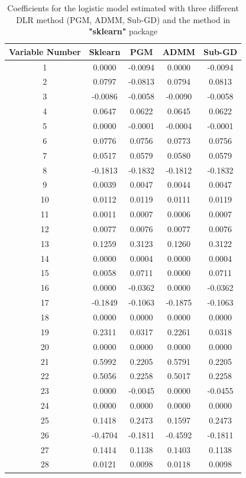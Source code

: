 \documentclass[11pt,en,authoryear]{elegantpaper}
\numberwithin{equation}{section}
\begin{document}
\begin{table}[h]
\label{table_res}
\centering
\begin{tabular}{c||c|c|c|c}
\hline
\hline
\textbf{Variable Number} & \textbf{Sklearn} &  \textbf{PGM}    &   \textbf{ADMM} &  \textbf{Sub-GD} \\ 
 \hline
1 & 0.0000  & -0.0094 &  0.0000 & -0.0094 \\ 
2 & 0.0797  & -0.0813 &  0.0794 &  0.0813 \\
3 & -0.0086 & -0.0058 & -0.0090 & -0.0058 \\
4 & 0.0647  &  0.0622 &  0.0645 &  0.0622 \\
5 & 0.0000  & -0.0001 & -0.0004 & -0.0001 \\
6 & 0.0776  &  0.0756 &  0.0773 &  0.0756 \\
7 & 0.0517  &  0.0579 &  0.0580 &  0.0579 \\
8 & -0.1813 & -0.1832 & -0.1812 & -0.1832 \\
9 & 0.0039  &  0.0047 &  0.0044 &  0.0047 \\
10 & 0.0112  &  0.0119 &  0.0111 &  0.0119 \\
11 & 0.0011  &  0.0007 &  0.0006 &  0.0007 \\
12 & 0.0077  &  0.0076 &  0.0077 &  0.0076 \\
13 & 0.1259  &  0.3123 &  0.1260 &  0.3122 \\
14 & 0.0000  &  0.0004 &  0.0000 &  0.0004 \\
15 & 0.0058  &  0.0711 &  0.0000 &  0.0711 \\
16 & 0.0000  & -0.0362 &  0.0000 & -0.0362 \\
17 & -0.1849 & -0.1063 & -0.1875 & -0.1063 \\
18 & 0.0000  &  0.0000 &  0.0000 &  0.0000 \\
19 & 0.2311  &  0.0317 &  0.2261 &  0.0318 \\
20 & 0.0000  &  0.0000 &  0.0000 &  0.0000 \\
21 & 0.5992  &  0.2205 &  0.5791 &  0.2205 \\
22 & 0.5056  &  0.2258 &  0.5017 &  0.2258 \\
23 & 0.0000  & -0.0045 &  0.0000 & -0.0455 \\
24 & 0.0000  &  0.0000 &  0.0000 &  0.0000 \\
25 & 0.1418  &  0.2473 &  0.1597 &  0.2473 \\
26 & -0.4704 & -0.1811 & -0.4592 & -0.1811 \\
27 & 0.1414  &  0.1138 &  0.1403 &  0.1138 \\
28 & 0.0121  &  0.0098 &  0.0118 &  0.0098 \\
\hline
\end{tabular}
\caption{Coefficients for the logistic model estimated with three different DLR method (PGM, ADMM, Sub-GD) and the method in \textbf{"sklearn"} package}
\end{table}

\newpage



\end{document}
